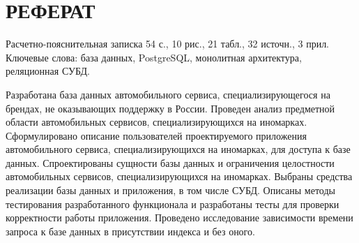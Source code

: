 \chapter*{РЕФЕРАТ}

Расчетно-пояснительная записка 54 с., 10 рис., 21 табл., 32 источн., 3 прил.
Ключевые слова: база данных, PostgreSQL, монолитная архитектура, реляционная СУБД.

Разработана база данных автомобильного сервиса, специализирующегося на брендах, не оказывающих поддержку в России. 
Проведен анализ предметной области автомобильных сервисов, специализирующихся на иномарках. 
Сформулировано описание пользователей проектируемого приложения автомобильного сервиса, специализирующихся на иномарках,  для доступа к базе данных.
Спроектированы сущности базы данных и ограничения целостности автомобильных сервисов, специализирующихся на иномарках.
Выбраны средства реализации базы данных и приложения, в том числе СУБД. Описаны методы тестирования разработанного функционала и разработаны тесты для проверки корректности работы приложения.
Проведено исследование зависимости времени запроса к базе данных в присутствии индекса и без оного.